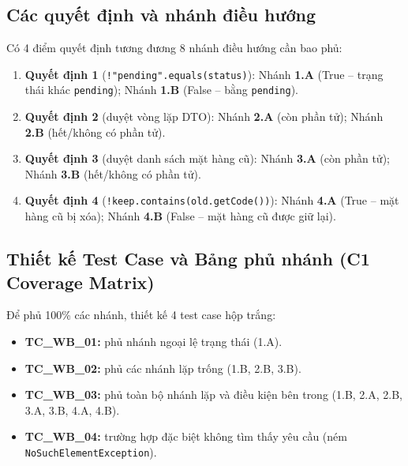 \documentclass[12pt,a4paper]{article}
\begin{document}
\subsection{Các quyết định và nhánh điều hướng}
Có 4 điểm quyết định tương đương 8 nhánh điều hướng cần bao phủ:
\begin{enumerate}[leftmargin=*]
  \item \textbf{Quyết định 1} (\texttt{!"pending".equals(status)}): Nhánh \textbf{1.A} (True -- trạng thái khác \texttt{pending}); Nhánh \textbf{1.B} (False -- bằng \texttt{pending}).
  \item \textbf{Quyết định 2} (duyệt vòng lặp DTO): Nhánh \textbf{2.A} (còn phần tử); Nhánh \textbf{2.B} (hết/không có phần tử).
  \item \textbf{Quyết định 3} (duyệt danh sách mặt hàng cũ): Nhánh \textbf{3.A} (còn phần tử); Nhánh \textbf{3.B} (hết/không có phần tử).
  \item \textbf{Quyết định 4} (\texttt{!keep.contains(old.getCode())}): Nhánh \textbf{4.A} (True -- mặt hàng cũ bị xóa); Nhánh \textbf{4.B} (False -- mặt hàng cũ được giữ lại).
\end{enumerate}

\subsection{Thiết kế Test Case và Bảng phủ nhánh (C1 Coverage Matrix)}
Để phủ 100\% các nhánh, thiết kế 4 test case hộp trắng:
\begin{itemize}[leftmargin=*]
  \item \textbf{TC\_WB\_01:} phủ nhánh ngoại lệ trạng thái (1.A).
  \item \textbf{TC\_WB\_02:} phủ các nhánh lặp trống (1.B, 2.B, 3.B).
  \item \textbf{TC\_WB\_03:} phủ toàn bộ nhánh lặp và điều kiện bên trong (1.B, 2.A, 2.B, 3.A, 3.B, 4.A, 4.B).
  \item \textbf{TC\_WB\_04:} trường hợp đặc biệt không tìm thấy yêu cầu (ném \texttt{NoSuchElementException}).
\end{itemize}
\end{document}

